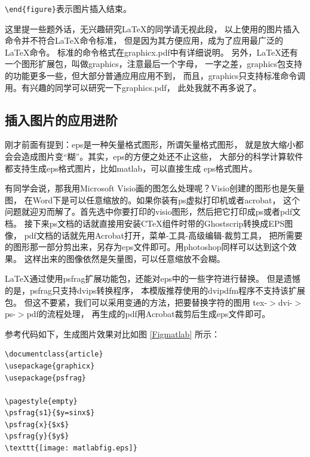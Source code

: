 \verb+\end{figure}+表示图片插入结束。

这里提一些题外话，无兴趣研究\LaTeX 的同学请无视此段，
以上使用的图片插入命令并不符合\LaTeX 命令标准，
但是因为其方便应用，成为了应用最广泛的\LaTeX 命令。
标准的命令格式在graphicx.pdf中有详细说明。
另外，\LaTeX 还有一个图形扩展包，叫做graphics，注意最后一个字母，
一字之差，graphics包支持的功能更多一些，但大部分普通应用应用不到，
而且，graphics只支持标准命令调用。有兴趣的同学可以研究一下graphics.pdf，
此处我就不再多说了。

\subsection{插入图片的应用进阶}

刚才前面有提到：eps是一种矢量格式图形，所谓矢量格式图形，
就是放大缩小都会会造成图片变“糊”。其实，eps的方便之处还不止这些，
大部分的科学计算软件都支持生成eps格式图片，比如matlab，可以直接生成
eps格式图片。

有同学会说，那我用Microsoft Visio画的图怎么处理呢？Visio创建的图形也是矢量图，
在Word下是可以任意缩放的。如果你装有ps虚拟打印机或者acrobat，
这个问题就迎刃而解了。首先选中你要打印的visio图形，然后把它打印成ps或者pdf文档。
接下来ps文档的话就直接用安装CTeX组件时带的Ghostscrip转换成EPS图像，
pdf文档的话就先用Acrobat打开，菜单-工具-高级编辑-裁剪工具，
把所需要的图形那一部分剪出来，另存为eps文件即可。用photoshop同样可以达到这个效果。
这样出来的图像依然是矢量图，可以任意缩放不会糊。

\LaTeX 通过使用psfrag扩展功能包，还能对eps中的一些字符进行替换。
但是遗憾的是，psfrag只支持dvips转换程序，
本模版推荐使用的dvipdfm程序不支持该扩展包。
但这不要紧，我们可以采用变通的方法，把要替换字符的图用
tex-$>$dvi-$>$ps-$>$pdf的流程处理，
再生成的pdf用Acrobat裁剪后生成eps文件即可。

参考代码如下，生成图片效果对比如图 \ref{Figmatlab} 所示：

{
\linespread{1}
\noindent
\begin{verbatim}
\documentclass{article}
\usepackage{graphicx}
\usepackage{psfrag}

\pagestyle{empty}
\psfrag{s1}{$y=sinx$}
\psfrag{x}{$x$}
\psfrag{y}{$y$}
\texttt{[image: matlabfig.eps]}
 
\end{verbatim}
}


